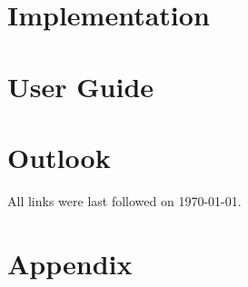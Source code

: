 \documentclass[
    paper=a4,
    oneside,  %
    bibliography=totoc,
    headsepline,
    cleardoublepage=empty,
    parskip=half,
    draft=false
]{scrbook}
\begin{document}
\chapter{Implementation}


\chapter{User Guide}


\chapter{Outlook}


\clearpage


\printbibliography

All links were last followed on \today.

\cleardoublepage

\chapter{Appendix}


\pagestyle{empty}
\renewcommand*{\chapterpagestyle}{empty}
\Versicherung
\end{document}
